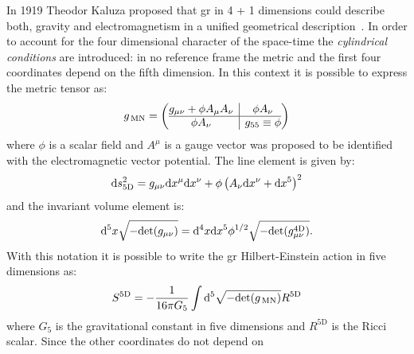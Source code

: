 In 1919 Theodor Kaluza proposed that \gls{gr} in 4 + 1 dimensions could describe
both, gravity and electromagnetism in a unified geometrical
description~\cite{Kaluza}. In order to account for the four dimensional
character of the space-time the \emph{cylindrical conditions} are introduced:
in no reference frame the metric and the first four coordinates depend on the
fifth dimension. In this context it is possible to express the metric tensor as:
\begin{equation}
  \label{eq:56}
  g_{\mathrm{\, MN}} =
  \left(
    \begin{array}{@{}c|c@{}}
      g_{\mu\nu} + \phi A_\mu A_\nu & \phi A_\nu \\
      \hline
      \phi A_\nu & g_{55} \equiv \phi
    \end{array}
  \right)
\end{equation}
where $\phi$ is a scalar field and $A^\mu$ is a gauge vector was proposed to be
identified with the electromagnetic vector potential. The line element is given
by:
\begin{equation}
  \label{eq:57}
  \mathrm{d} s^2_{5 \mathrm{D}} = g_{\mu\nu} \mathrm{d} x^\mu \mathrm{d} x^\nu + \phi \left( A_\nu
    \mathrm{d} x^\nu + \mathrm{d} x^5 \right)^2
\end{equation}
and the invariant volume element is:
\begin{equation}
  \label{eq:58}
  \mathrm{d}^5 x \sqrt{- \mathrm{det}(g_{\mu\nu})} = \mathrm{d}^4 x \mathrm{d} x^5 \phi^{1/2} \sqrt{-
  \mathrm{det}(g_{\mu\nu}^{4 \mathrm{D}})}.
\end{equation}
With this notation it is possible to write the \gls{gr} Hilbert-Einstein action
in five dimensions as:
\begin{equation}
  \label{eq:59}
  S^{5 \mathrm{D}} = - \frac{1}{16 \pi G_5} \int \mathrm{d}^5 \sqrt{-
    \mathrm{det}(g_{\mathrm{\, MN}})} R^{5 \mathrm{D}}
\end{equation}
where $G_5$ is the gravitational constant in five dimensions and $R^{5
  \mathrm{D}}$ is the Ricci scalar. Since the other coordinates do not depend on
